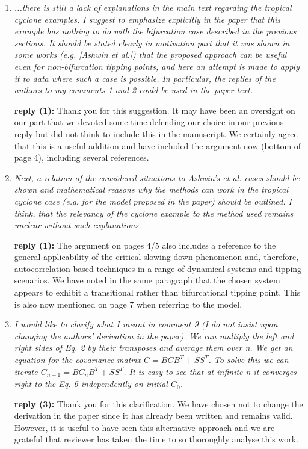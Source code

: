 \documentclass[12pt]{article}
\begin{document}
\begin{enumerate}
\item \textit{...there is still a lack of explanations in the main text regarding the tropical cyclone examples. I suggest to emphasize explicitly in the paper that this example has nothing to do with the bifurcation case described in the previous sections. It should be stated clearly in motivation part that it was shown in some works (e.g. [Ashwin et al.]) that the proposed approach can be useful even for non-bifurcation tipping points, and here an attempt is made to apply it to data where such a case is possible. In particular, the replies of the authors to my comments 1 and 2 could be used in the paper text.}

\textbf{reply (1):} Thank you for this suggestion. It may have been an oversight on our part that we devoted some time defending our choice in our previous reply but did not think to include this in the manuscript. We certainly agree that this is a useful addition and have included the argument now (bottom of page 4), including several references. 

\item \textit{Next, a relation of the considered situations to Ashwin's et al. cases should be shown and mathematical reasons why the methods can work in the tropical cyclone case (e.g. for the model proposed in the paper) should be outlined. I think, that the relevancy of the cyclone example to the method used remains unclear without such explanations. }
	
\textbf{reply (1):} The argument on pages 4/5 also includes a reference to the general applicability of the critical slowing down phenomenon and, therefore, autocorrelation-based techniques in a range of dynamical systems and tipping scenarios. We have noted in the same paragraph that the chosen system appears to exhibit a transitional rather than bifurcational tipping point. This is also now mentioned on page 7 when referring to the model.
	
\item \textit{I would like to clarify what I meant in comment 9 (I do not insist upon changing the authors' derivation in the paper). We can multiply the left and right sides of Eq. 2 by their transposes and average them over n. We get an equation for the covariance matrix $C=BCB^T+SS^T$. To solve this we can iterate $C_{n+1}=BC_nB^T+SS^T$. It is easy to see that at infinite n it converges right to the Eq. 6 independently on initial $C_0$.}

\textbf{reply (3):}	Thank you for this clarification. We have chosen not to change the derivation in the paper since it has already been written and remains valid. However, it is useful to have seen this alternative approach and we are grateful that reviewer has taken the time to so thoroughly analyse this work.

\end{enumerate}
\end{document}

